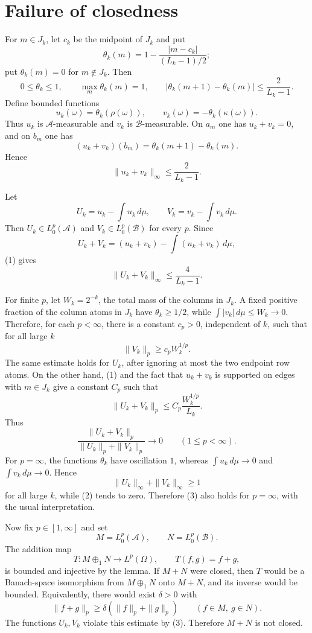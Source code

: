 \documentclass[11pt]{amsart}
\newcommand{\A}{\mathcal A}
\newcommand{\B}{\mathcal B}
\begin{document}
\section*{Failure of closedness}

For \(m\in J_k\), let \(c_k\) be the midpoint of \(J_k\) and put
\[
  \theta_k(m)=1-\frac{|m-c_k|}{(L_k-1)/2};
\]
put \(\theta_k(m)=0\) for \(m\notin J_k\).  Then
\[
  0\le \theta_k\le1,\qquad
  \max_m\theta_k(m)=1,\qquad
  |\theta_k(m+1)-\theta_k(m)|\le \frac{2}{L_k-1}.
\]
Define bounded functions
\[
  u_k(\omega)=\theta_k(\rho(\omega)),\qquad
  v_k(\omega)=-\theta_k(\kappa(\omega)).
\]
Thus \(u_k\) is \(\A\)-measurable and \(v_k\) is \(\B\)-measurable.  On
\(a_m\) one has \(u_k+v_k=0\), and on \(b_m\) one has
\[
  (u_k+v_k)(b_m)=\theta_k(m+1)-\theta_k(m).
\]
Hence
\[
  \|u_k+v_k\|_\infty\le \frac{2}{L_k-1}. \tag{1}
\]

Let
\[
  U_k=u_k-\int u_k\,d\mu,\qquad
  V_k=v_k-\int v_k\,d\mu.
\]
Then \(U_k\in L^p_0(\A)\) and \(V_k\in L^p_0(\B)\) for every \(p\).  Since
\[
  U_k+V_k=(u_k+v_k)-\int (u_k+v_k)\,d\mu,
\]
(1) gives
\[
  \|U_k+V_k\|_\infty\le \frac{4}{L_k-1}. \tag{2}
\]

For finite \(p\), let \(W_k=2^{-k}\), the total mass of the columns in
\(J_k\).  A fixed positive fraction of the column atoms in \(J_k\) have
\(\theta_k\ge 1/2\), while \(\int |v_k|\,d\mu\le W_k\to0\).  Therefore, for
each \(p<\infty\), there is a constant \(c_p>0\), independent of \(k\), such
that for all large \(k\)
\[
  \|V_k\|_p\ge c_p W_k^{1/p}.
\]
The same estimate holds for \(U_k\), after ignoring at most the two endpoint
row atoms.  On the other hand, (1) and the fact that \(u_k+v_k\) is supported
on edges with \(m\in J_k\) give a constant \(C_p\) such that
\[
  \|U_k+V_k\|_p\le C_p\frac{W_k^{1/p}}{L_k}.
\]
Thus
\[
  \frac{\|U_k+V_k\|_p}{\|U_k\|_p+\|V_k\|_p}\longrightarrow0
  \qquad(1\le p<\infty). \tag{3}
\]
For \(p=\infty\), the functions \(\theta_k\) have oscillation \(1\), whereas
\(\int u_k\,d\mu\to0\) and \(\int v_k\,d\mu\to0\).  Hence
\[
  \|U_k\|_\infty+\|V_k\|_\infty\ge 1
\]
for all large \(k\), while (2) tends to zero.  Therefore (3) also holds for
\(p=\infty\), with the usual interpretation.

Now fix \(p\in[1,\infty]\) and set
\[
  M=L^p_0(\A),\qquad N=L^p_0(\B).
\]
The addition map
\[
  T:M\oplus_1 N\to L^p(\Omega),\qquad T(f,g)=f+g,
\]
is bounded and injective by the lemma.  If \(M+N\) were closed, then \(T\)
would be a Banach-space isomorphism from \(M\oplus_1N\) onto \(M+N\), and its
inverse would be bounded.  Equivalently, there would exist \(\delta>0\) with
\[
  \|f+g\|_p\ge \delta(\|f\|_p+\|g\|_p)
  \qquad(f\in M,\ g\in N).
\]
The functions \(U_k,V_k\) violate this estimate by (3).  Therefore \(M+N\) is
not closed.
\end{document}
